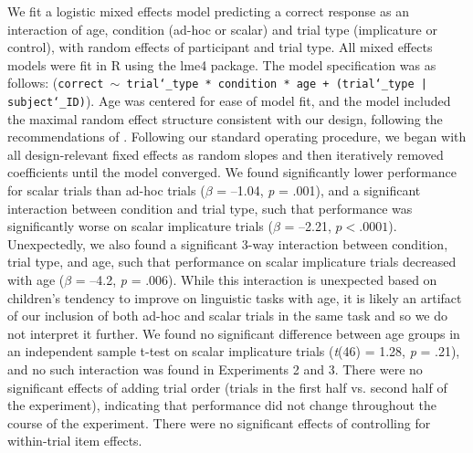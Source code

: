 \documentclass[man]{apa2}
\begin{document}


We fit a logistic mixed effects model predicting a correct response as an interaction of age, condition (ad-hoc or scalar) and trial type (implicature or control), with random effects of participant and trial type. All mixed effects models were fit in R using the lme4 package. The model specification was as follows: ({\tt{correct $\sim$ trial\char`_type * condition * age + (trial\char`_type | subject\char`_ID)}}). Age was centered for ease of model fit, and the model included the maximal random effect structure consistent with our design, following the recommendations of . Following our standard operating procedure, we began with all design-relevant fixed effects as random slopes and then iteratively removed coefficients until the model converged. We found significantly lower performance for scalar trials than ad-hoc trials ($\beta$ = --1.04, \textit{p} = .001), and a significant interaction between condition and trial type, such that performance was significantly worse on scalar implicature trials ($\beta$ = --2.21, $p < .0001$). Unexpectedly, we also found a significant 3-way interaction between condition, trial type, and age, such that performance on scalar implicature trials decreased with age ($\beta$ = --4.2, \textit{p} = .006). While this interaction is unexpected based on children's tendency to improve on linguistic tasks with age, it is likely an artifact of our inclusion of both ad-hoc and scalar trials in the same task and so we do not interpret it further. We found no significant difference between age groups in an independent sample t-test on scalar implicature trials (\emph{t}(46) = 1.28, \emph{p} = .21), and no such interaction was found in Experiments 2 and 3. There were no significant effects of adding trial order (trials in the first half vs. second half of the experiment), indicating that performance did not change throughout the course of the experiment. There were no significant effects of controlling for within-trial item effects.
\end{document}
